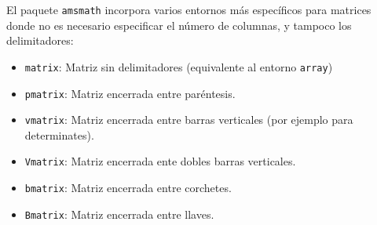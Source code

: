 \documentclass[
  a4paper,
]{scrreport}
\providecommand{\tightlist}{%
  \setlength{\itemsep}{0pt}\setlength{\parskip}{0pt}}\usepackage{longtable,booktabs,array}
\theoremstyle{definition}
\theoremstyle{remark}
\begin{document}
El paquete \texttt{amsmath} incorpora varios entornos más específicos
para matrices donde no es necesario especificar el número de columnas, y
tampoco los delimitadores:

\begin{itemize}
\tightlist
\item
  \texttt{matrix}: Matriz sin delimitadores (equivalente al entorno
  \texttt{array})
\item
  \texttt{pmatrix}: Matriz encerrada entre paréntesis.
\item
  \texttt{vmatrix}: Matriz encerrada entre barras verticales (por
  ejemplo para determinates).
\item
  \texttt{Vmatrix}: Matriz encerrada ente dobles barras verticales.
\item
  \texttt{bmatrix}: Matriz encerrada entre corchetes.
\item
  \texttt{Bmatrix}: Matriz encerrada entre llaves.
\end{itemize}
\end{document}
